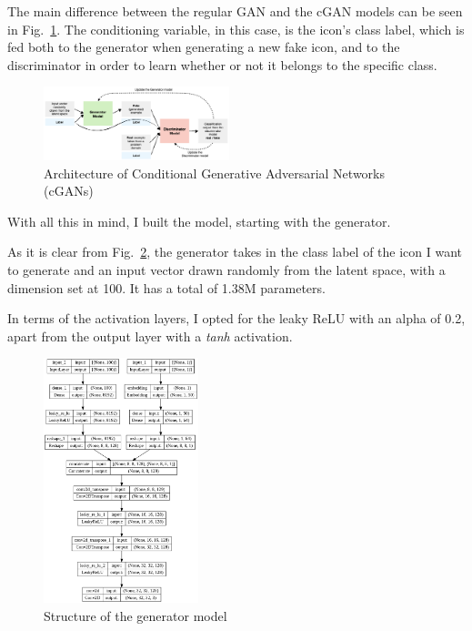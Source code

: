 \documentclass[conference]{IEEEtran}
\begin{document}
The main difference between the regular GAN and the cGAN models can be seen in Fig.~\ref{fig:cGANArch}. The conditioning variable, in this case, is the icon's class label, which is fed both to the generator when generating a new fake icon, and to the discriminator in order to learn whether or not it belongs to the specific class.

\begin{figure}[htbp]
    \centering
    \includegraphics[width=0.48\textwidth]{paper/images/architecture/cgan_arch.png}
    \caption{Architecture of Conditional Generative Adversarial Networks (cGANs)}
    \label{fig:cGANArch}
\end{figure}

With all this in mind, I built the model, starting with the generator. 

As it is clear from Fig.~\ref{fig:GenStruct}, the generator takes in the class label of the icon I want to generate and an input vector drawn randomly from the latent space, with a dimension set at 100. It has a total of 1.38M parameters.

In terms of the activation layers, I opted for the leaky ReLU with an alpha of 0.2, apart from the output layer with a \textit{tanh} activation.

\begin{figure}[htbp]
    \centering
    \includegraphics[width=0.4\textwidth]{paper/images/summary/generator.png}
    \caption{Structure of the generator model}
    \label{fig:GenStruct}
\end{figure}
\end{document}
